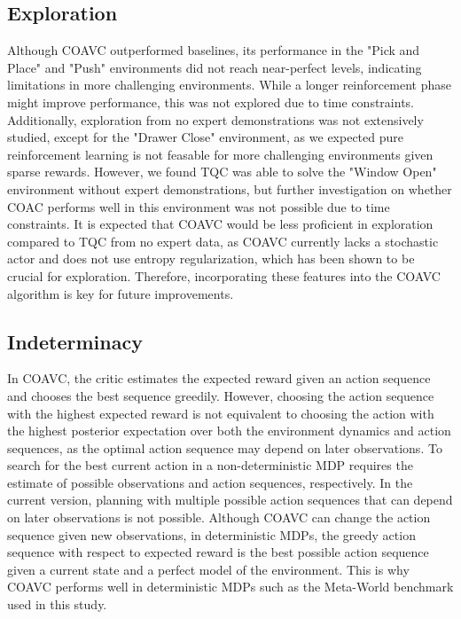 \subsection{Exploration}
Although COAVC outperformed baselines, its performance in the "Pick and Place" and "Push" environments did not reach near-perfect levels, 
indicating limitations in more challenging environments. While a longer reinforcement phase might improve performance, this was not explored 
due to time constraints. Additionally, exploration from no expert demonstrations was not extensively studied, except for the "Drawer Close" 
environment, as we expected pure reinforcement learning is not feasable for more challenging environments given sparse rewards. 
However, we found TQC was able to solve the "Window Open" environment without expert demonstrations, but further investigation on whether 
COAC performs well in this environment was not possible due to time constraints. It is expected that COAVC would be less proficient in exploration 
compared to TQC from no expert data, as COAVC currently lacks a stochastic actor and does not use entropy regularization, which has been shown to 
be crucial for exploration. Therefore, incorporating these features into the COAVC algorithm is key for future improvements.

\subsection{Indeterminacy}
In COAVC, the critic estimates the expected reward given an action sequence and chooses the best sequence greedily. 
However, choosing the action sequence with the highest expected reward is not equivalent to choosing the action with the highest posterior 
expectation over both the environment dynamics and action sequences, as the optimal action sequence may depend on later observations. To 
search for the best current action in a non-deterministic MDP requires the estimate of possible observations and action sequences, respectively. 
In the current version, planning with multiple possible action sequences that can depend on later observations is not possible. 
Although COAVC can change the action sequence given new observations, in deterministic MDPs, the greedy action sequence with respect to expected 
reward is the best possible action sequence given a current state and a perfect model of the environment. This is why COAVC performs well in 
deterministic MDPs such as the Meta-World benchmark used in this study.